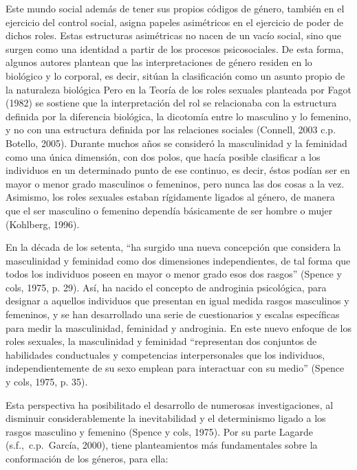 Este mundo social además de tener sus propios códigos de género, también en el
ejercicio del control social, asigna papeles asimétricos en el ejercicio de
poder de dichos roles.
Estas estructuras asimétricas no nacen de un vacío social, sino que surgen como
una identidad a partir de los procesos psicosociales.
De esta forma, algunos autores plantean que las interpretaciones de género
residen en lo biológico y lo corporal, es decir, sitúan la clasificación como un
asunto propio de la naturaleza biológica
Pero en la Teoría de los roles sexuales planteada por Fagot (1982) se sostiene
que la interpretación del rol se relacionaba con la estructura definida por la
diferencia biológica, la dicotomía entre lo masculino y lo femenino, y no con
una estructura definida por las relaciones sociales (Connell, 2003 c.p.
Botello, 2005).
Durante muchos años se consideró la masculinidad y la feminidad como una única
dimensión, con dos polos, que hacía posible clasificar a los individuos en un
determinado punto de ese continuo, es decir, éstos podían ser en mayor o menor
grado masculinos o femeninos, pero nunca las dos cosas a la vez.
Asimismo, los roles sexuales estaban rígidamente ligados al género, de manera
que el ser masculino o femenino dependía básicamente de ser hombre o mujer
(Kohlberg, 1996).

En la década de los setenta, “ha surgido una nueva concepción que considera
la masculinidad y feminidad como dos dimensiones independientes, de tal forma
que todos los individuos poseen en mayor o menor grado esos dos rasgos”
(Spence y cols, 1975, p. 29).
Así, ha nacido el concepto de androginia psicológica, para designar a aquellos
individuos que presentan en igual medida rasgos masculinos y femeninos, y se han
desarrollado una serie de cuestionarios y escalas específicas para medir la
masculinidad, feminidad y androginia.
En este nuevo enfoque de los roles sexuales, la masculinidad y feminidad
“representan dos conjuntos de habilidades conductuales y competencias
interpersonales que los individuos, independientemente de su sexo emplean para
interactuar con su medio” (Spence y cols, 1975, p. 35).

Esta perspectiva ha posibilitado el desarrollo de numerosas investigaciones, al
disminuir considerablemente la inevitabilidad y el determinismo ligado a los
rasgos masculino y femenino (Spence y cols, 1975).
Por su parte Lagarde (s.f.,\ c.p.~García, 2000), tiene planteamientos más
fundamentales sobre la conformación de los géneros, para ella:

